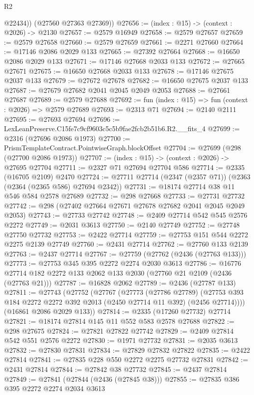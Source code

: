 \begin{lexlean}{R2}
\begin{coremodule}
          @22434))
      (@27560 @27363 @27369))
@27656 := (index : @15) -> (context : @2026) -> @2130
@27657 := @2579 @16949
@27658 := @2579 @27657
@27659 := @2579 @27658
@27660 := @2579 @27659
@27661 := @2271 @27660
@27664 := @17146 @2086 @2029 @133
@27665 := @27392 @27664
@27668 := @16650 @2086 @2029 @133
@27671 := @17146 @27668 @2033 @133
@27672 := @27665 @27671
@27675 := @16650 @27668 @2033 @133
@27678 := @17146 @27675 @2037 @133
@27679 := @27672 @27678
@27682 := @16650 @27675 @2037 @133
@27687 := @27679 @27682 @2041 @2045 @2049 @2053
@27688 := @27661 @27687
@27689 := @2579 @27688
@27692 := fun (index : @15) => fun (context : @2026) => @2579 @27689
@27693 := @2313 @71
@27694 := @2140 @2111
@27695 := @27693 @27694
@27696 := LexLeanPreserve.C15fe7c9cf9603c5c5b9fae2fcb2b51b6.R2.__fits_4
@27699 := @2316 (@27696 @2086 @1973)
@27700 := PrismTemplateContract.PointwiseGraph.blockOffset
@27704 := @27699 (@298 (@27700 @2086 @1973))
@27707 := (index : @15) -> (context : @2026) -> @27695 @27704
@27711 := @2327 @71 @27694 @27704 @586
@27714 := @2335 (@16705 @2109) @2470
@27724 := @27711 @27714 (@2347 (@2357 @71)) (@2363 (@2364 (@2365 @586) @27694 @2342))
@27731 := @18174 @27714 @38 @11 @546 @584 @2578 @27689
@27732 := @298 @27668
@27733 := @27731 @27732
@27742 := @298 (@27402 @27664 @27671 @27678 @27682 @2041 @2045 @2049 @2053)
@27743 := @27733 @27742
@27748 := @2409 @27714 @542 @545 @2576 @2272
@27749 := @2031 @3613
@27750 := @2140 @27749
@27752 := @27748 @27750 @27732
@27753 := @2422 @27714
@27759 := @27753 @151 @544 @2272 @2275 @2139 @27749
@27760 := @2431 @27714
@27762 := @27760 @133 @2139
@27763 := @2437 @27714
@27767 := @27759 (@27762 (@2436 (@27763 @133)))
@27773 := @27753 @345 @395 @2272 @2274 @2030 @3613
@27786 := @16776 @27714 @182 @2272 @133 @2062 @133 @2030 (@27760 @21 @2109 (@2436 (@27763 @21)))
@27787 := @16828 @2062
@27789 := @2436 (@27787 @133)
@27811 := @27743
    (@27752
      (@27767
        (@27773
          (@27786 @27789)
          (@27753 @393 @184 @2272 @2272 @392 @2013 (@2450 @27714 @11 @392) (@2456 @27714))))
      (@16861 @2086 @2029 @133))
@27814 := @2335 (@17260 @27732) @27714
@27821 := @18174 @27814 @145 @11 @552 @583 @2578 @27688
@27822 := @298 @27675
@27824 := @27821 @27822 @27742
@27829 := @2409 @27814 @542 @551 @2576 @2272
@27830 := @1971 @27732
@27831 := @2035 @3613
@27832 := @27830 @27831
@27834 := @27829 @27832 @27822
@27835 := @2422 @27814
@27841 := @27835 @228 @550 @2272 @2275 @27732 @27831
@27842 := @2431 @27814
@27844 := @27842 @38 @27732
@27845 := @2437 @27814
@27849 := @27841 (@27844 (@2436 (@27845 @38)))
@27855 := @27835 @386 @395 @2272 @2274 @2034 @3613

\end{coremodule}
\end{lexlean}
